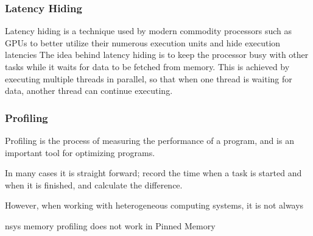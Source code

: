 \subsubsection{Latency Hiding}
Latency hiding is a technique used by modern commodity processors such as GPUs to better utilize their numerous execution units and hide execution latencies \cite[35]{volkovLatencyHiding2016}
The idea behind latency hiding is to keep the processor busy with other tasks while it waits for data to be fetched from memory.
This is achieved by executing multiple threads in parallel, so that when one thread is waiting for data, another thread can continue executing.


\subsubsection{Profiling}
Profiling is the process of measuring the performance of a program, and is an important tool for optimizing programs.

In many cases it is straight forward; record the time when a task is started and when it is finished, and calculate the difference.


However, when working with heterogeneous computing systems, it is not always

nsys memory profiling does not work in Pinned Memory

